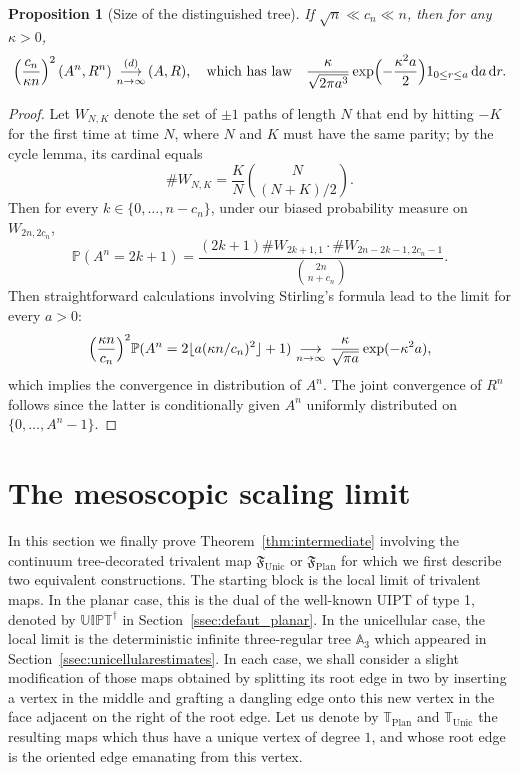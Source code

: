 \documentclass[11pt]{article}
\theoremstyle{plain}
\newtheorem{proposition}[theorem]{Proposition}
\theoremstyle{definition}
\theoremstyle{remark}
\renewcommand{\P}{\mathbb{P}}
\renewcommand{\d}{\mathop{}\!\mathrm{d}}
\newcommand{\cv}[1][n]{\,\mathop{\longrightarrow}^{}_{#1 \to \infty}\,}
\newcommand{\cvloi}[1][n]{\,\mathop{\longrightarrow}^{(d)}_{#1 \to \infty}\,}
\DeclarePairedDelimiter\floor{\lfloor}{\rfloor}
\begin{document}
\begin{proposition}[Size of the distinguished tree]\label{prop:volume_arbre_racine}
If $\sqrt{n} \ll c_n \ll n$, then for any $\kappa >0$,
\[
\left(\frac{c_n}{\kappa n}\right)^2 \left(A^n, R^n\right) \cvloi (A, R),
\quad\text{which has law}\quad
\frac{\kappa}{\sqrt{2 \pi a^3}} \exp\Bigl(- \frac{\kappa^2 a}{2}\Bigr) 1_{0 \le r \le a} \d a \d r.
\]
\end{proposition}

\begin{proof}
Let $W_{N,K}$ denote the set of $\pm1$ paths of length $N$ that end by hitting $-K$ for the first time at time $N$, where $N$ and $K$ must have the same parity; by the cycle lemma, its cardinal equals
\[
\#W_{N,K} = \frac{K}{N} \binom{N}{(N+K)/2}.
\]
Then for every $k \in \{0, \dots, n-c_{n}\}$, under our biased probability measure on $W_{2n, 2c_{n}}$,
\[
\P(A^n = 2k+1) = \frac{(2k+1) \#W_{2k+1,1} \cdot \#W_{2n-2k-1, 2c_{n}-1}}{\binom{2n}{n+c_{n}}}.
\]
Then straightforward calculations involving Stirling's formula lead to the limit for every $a>0$:
\[
\Bigl(\frac{\kappa n}{c_n}\Bigr)^2 \P(A^n = 2\floor{a (\kappa n/c_n)^2}+1)
\cv \frac{\kappa}{\sqrt{\pi a}} \exp(- \kappa^2 a),
\]
which implies the convergence in distribution of $A^n$.
The joint convergence of $R^n$ follows since the latter is conditionally given $A^n$ uniformly distributed on \hbox{$\{0, \dots, A^n\!-\!1\}$}.
\end{proof}

\section{The mesoscopic scaling limit}
\label{sec:mesoscopic}

In this section we finally prove Theorem~\ref{thm:intermediate} involving the continuum tree-decorated trivalent map $\mathfrak{F}_{ \mathrm{Unic}}$ or $\mathfrak{F}_{ \mathrm{Plan}}$ for which we first describe two equivalent constructions. The starting block is the local limit of trivalent maps.
In the planar case, this is the dual of the well-known UIPT of type 1, denoted by $\mathbb{UIPT}^\dagger$ in Section~\ref{ssec:defaut_planar}. In the unicellular case, the local limit is the deterministic infinite three-regular tree $\mathbb{A}_3$ which appeared in Section~\ref{ssec:unicellularestimates}.
In each case, we shall consider a slight modification of those maps obtained by splitting its root edge in two by inserting a vertex in the middle and grafting a dangling edge onto this new vertex in the face adjacent on the right of the root edge. Let us denote by $\mathbb{T}_ \mathrm{Plan}$ and $\mathbb{T}_{ \mathrm{Unic}}$ the resulting maps which thus have a unique vertex of degree $1$, and whose root edge is the oriented edge emanating from this vertex.
\end{document}
